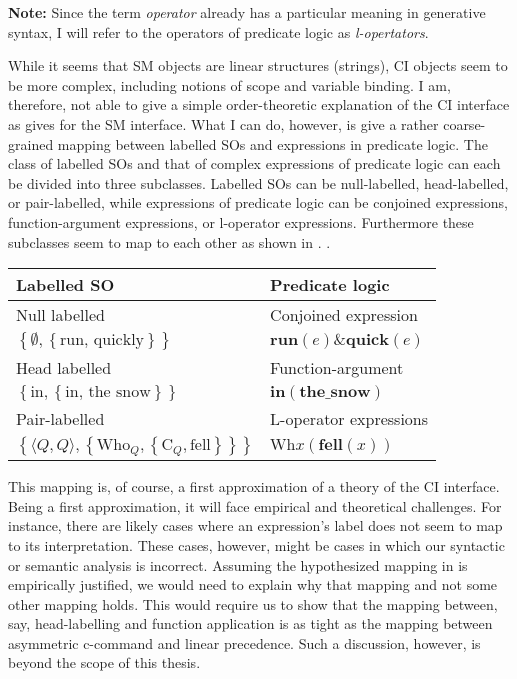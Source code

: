 \documentclass[MilwayThesis]{subfiles}
\begin{document}
\textbf{Note:} Since the term \textit{operator} already has a particular meaning in generative syntax, I will refer to the operators of predicate logic as \textit{l-opertators}.

While it seems that SM objects are linear structures (strings), CI objects seem to be more complex, including notions of scope and variable binding.
I am, therefore, not able to give a simple order-theoretic explanation of the CI interface as \textcite{kayne1994antisymmetry} gives for the SM interface.
What I can do, however, is give a rather coarse-grained mapping between labelled SOs and expressions in predicate logic.
The class of labelled SOs and that of complex expressions of predicate logic can each be divided into three subclasses.
Labelled SOs can be null-labelled, head-labelled, or pair-labelled, while expressions of predicate logic can be conjoined expressions, function-argument expressions, or l-operator expressions.
Furthermore these subclasses seem to map to each other as shown in \Next.
\ex.
\begin{tabular}[t]{ll}
	Labelled SO & Predicate logic\\
	\hline
	\hline
	Null labelled & Conjoined expression\\
	$\left\{ \emptyset, \left\{ \text{run, quickly} \right\} \right\}$ & $\textbf{run}(e) \& \textbf{quick}(e)$\\
	\hline
	Head labelled & Function-argument\\
	$\left\{ \text{in}, \left\{ \text{in, the snow} \right\} \right\}$ & $\textbf{in}(\textbf{the\_snow})$\\
	\hline
	Pair-labelled & L-operator expressions\\
	$\left\{ \langle Q,Q\rangle, \left\{\text{Who}_Q, \left\{\text{C}_Q, \text{fell} \right\}  \right\} \right\}$ & $\text{Wh}x(\textbf{fell}(x))$\\
	\hline
\end{tabular}

This mapping is, of course, a first approximation of a theory of the CI interface.
Being a first approximation, it will face empirical and theoretical challenges.
For instance, there are likely cases where an expression's label does not seem to map to its interpretation.
These cases, however, might be cases in which our syntactic or semantic analysis is incorrect.
Assuming the hypothesized mapping in \Last is empirically justified, we would need to explain why that mapping and not some other mapping holds.
This would require us to show that the mapping between, say, head-labelling and function application is as tight as the mapping between asymmetric c-command and linear precedence.
Such a discussion, however, is beyond the scope of this thesis.
\end{document}
